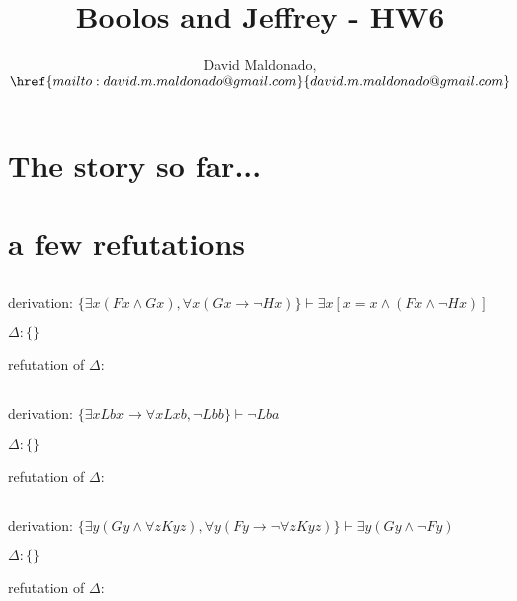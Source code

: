 \documentclass[a4paper,11pt]{article}
\author{David Maldonado, $\href{mailto:david.m.maldonado@gmail.com}%
{david.m.maldonado@gmail.com}$}
\title{Boolos and Jeffrey - HW6}
\begin{document}
\maketitle


\section{The story so far...}

\section{a few refutations}


\subsection{}

derivation: $ \{ \exists x(Fx \land Gx), \forall x(Gx \rightarrow \lnot Hx) \} \vdash \exists x[x=x \land (Fx \land \lnot Hx)] $

\bigskip

\noindent $\Delta: \{ \}$

\bigskip

\noindent refutation of $\Delta:$


\subsection{}

derivation: $\{ \exists x Lbx \rightarrow \forall x Lxb, \lnot Lbb \} \vdash \lnot Lba $

\bigskip

\noindent $\Delta: \{ \}$

\bigskip

\noindent refutation of $\Delta:$


\subsection{}

derivation: $\{ \exists y(Gy \land \forall z Kyz), \forall y(Fy \rightarrow \lnot \forall z Kyz) \} \vdash \exists y(Gy \land \lnot Fy) $

\bigskip

\noindent $\Delta: \{ \} $

\bigskip

\noindent refutation of $\Delta:$
\end{document}
